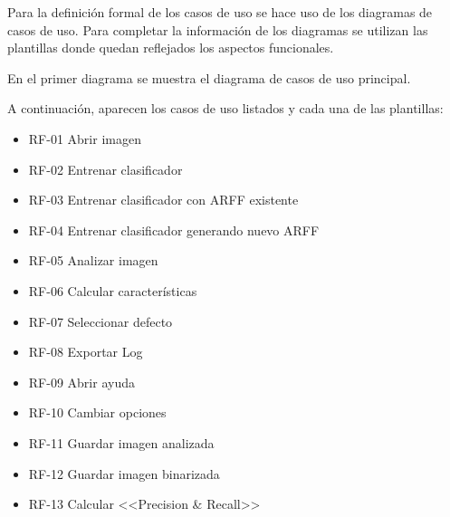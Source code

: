Para la definición formal de los casos de uso se hace uso de los diagramas de casos de uso. Para completar la información de los diagramas se utilizan las plantillas donde quedan reflejados los aspectos funcionales.

En el primer diagrama  se muestra el diagrama de casos de uso principal.





\newpage
A continuación, aparecen los casos de uso listados y cada una de las plantillas:
\begin{itemize}
 \item RF-01 Abrir imagen 
 \item RF-02 Entrenar clasificador 
 \item RF-03 Entrenar clasificador con ARFF existente 
 \item RF-04 Entrenar clasificador generando nuevo ARFF 
 \item RF-05 Analizar imagen 
 \item RF-06 Calcular características 
 \item RF-07 Seleccionar defecto 
 \item RF-08 Exportar Log 
 \item RF-09 Abrir ayuda 
 \item RF-10 Cambiar opciones 
 \item RF-11 Guardar imagen analizada 
 \item RF-12 Guardar imagen binarizada 
 \item RF-13 Calcular <<Precision \& Recall>> 
\end{itemize}

